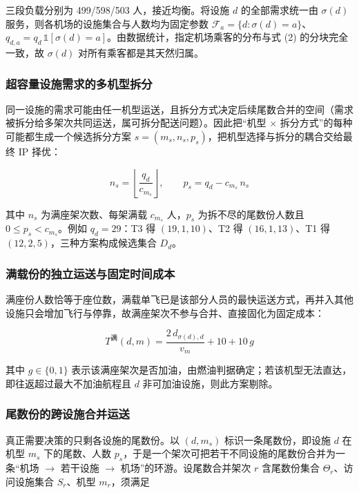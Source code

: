 \documentclass[UTF8,zihao=-4]{ctexart}
\numberwithin{figure}{section}
\numberwithin{table}{section}
\begin{document}
三段负载分别为 499/598/503 人，接近均衡。将设施 $d$ 的全部需求统一由 $\sigma(d)$ 服务，则各机场的设施集合与人数均为固定参数 $\mathcal{F}_a=\{d:\sigma(d)=a\}$、$q_{d,a}=q_d\,\mathbb{1}[\sigma(d)=a]$。由数据统计，指定机场乘客的分布与式 (2) 的分块完全一致，故 $\sigma(d)$ 对所有乘客都是其天然归属。

\subsubsection{超容量设施需求的多机型拆分}

同一设施的需求可能由任一机型运送，且拆分方式决定后续尾数合并的空间（需求被拆分给多架次共同运送，属可拆分配送问题\cite{ref:sd}）。因此把“机型 $\times$ 拆分方式”的每种可能都生成一个候选拆分方案 $s=(m_s,n_s,p_s)$，把机型选择与拆分的耦合交给最终 IP 择优：

\begin{equation}
  n_s=\left\lfloor\frac{q_d}{c_{m_s}}\right\rfloor,\qquad p_s=q_d-c_{m_s}\,n_s
\end{equation}

其中 $n_s$ 为满座架次数、每架满载 $c_{m_s}$ 人，$p_s$ 为拆不尽的尾数份人数且 $0\le p_s<c_{m_s}$。例如 $q_d=29$：T3 得 $(19,1,10)$、T2 得 $(16,1,13)$、T1 得 $(12,2,5)$，三种方案构成候选集合 $D_d$。

\subsubsection{满载份的独立运送与固定时间成本}

满座份人数恰等于座位数，满载单飞已是该部分人员的最快运送方式，再并入其他设施只会增加飞行与停靠，故满座架次不参与合并、直接固化为固定成本：

\begin{equation}
  T^{\text{满}}(d,m)=\frac{2\,d_{\sigma(d),d}}{v_m}+10+10\,g
\end{equation}

其中 $g\in\{0,1\}$ 表示该满座架次是否加油，由燃油判据确定；若该机型无法直达，即往返超过最大不加油航程且 $d$ 非可加油设施，则此方案剔除。

\subsubsection{尾数份的跨设施合并运送}

真正需要决策的只剩各设施的尾数份。以 $(d,m_s)$ 标识一条尾数份，即设施 $d$ 在机型 $m_s$ 下的尾数、人数 $p_s$，于是一个架次可把若干不同设施的尾数份合并为一条“机场 $\to$ 若干设施 $\to$ 机场”的环游。设尾数合并架次 $r$ 含尾数份集合 $\Theta_r$、访问设施集合 $S_r$、机型 $m_r$，须满足
\end{document}
